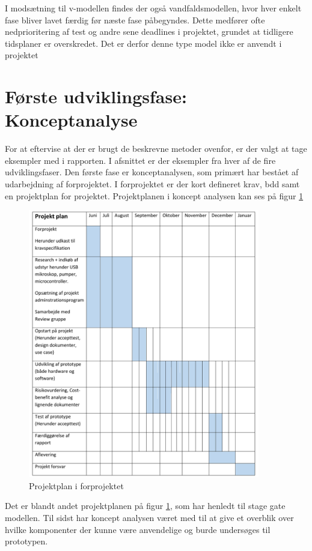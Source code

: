 I modsætning til v-modellen findes der også vandfaldsmodellen, hvor hver enkelt fase bliver lavet færdig før næste fase påbegyndes. Dette medfører ofte nedprioritering af test og andre sene deadlines i projektet, grundet at tidligere tidsplaner er overskredet. Det er derfor denne type model ikke er anvendt i projektet
\newpage

\section{Første udviklingsfase: Konceptanalyse}
For at eftervise at der er brugt de beskrevne metoder ovenfor, er der valgt at tage eksempler med i rapporten. I afsnittet er der eksempler fra hver af de fire udviklingsfaser. Den første fase er konceptanalysen, som primært har bestået af udarbejdning af forprojektet. I forprojektet er der kort defineret krav, bdd samt en projektplan for projektet. Projektplanen i koncept analysen kan ses på figur \ref{fig:forprojekt}

\begin{figure}[H]
	\centering
	\includegraphics[width=0.9\textwidth]{billeder/Hovedrapport/forprojektplan.pdf}
	\caption{Projektplan i forprojektet}
	\label{fig:forprojekt}
\end{figure}
Det er blandt andet projektplanen på figur \ref{fig:forprojekt}, som har henledt til stage gate modellen. Til sidst har koncept analysen været med til at give et overblik over hvilke komponenter der kunne være anvendelige og burde undersøges til prototypen.
 
